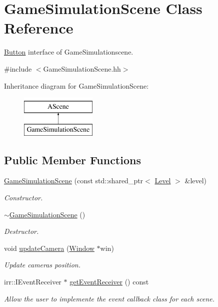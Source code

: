 \hypertarget{classGameSimulationScene}{}\section{Game\+Simulation\+Scene Class Reference}
\label{classGameSimulationScene}


\hyperlink{classButton}{Button} interface of Game\+Simulationscene.  




{\ttfamily \#include $<$Game\+Simulation\+Scene.\+hh$>$}

Inheritance diagram for Game\+Simulation\+Scene\+:\begin{figure}[H]
\begin{center}
\leavevmode
\includegraphics[height=2.000000cm]{classGameSimulationScene}
\end{center}
\end{figure}
\subsection*{Public Member Functions}
\begin{DoxyCompactItemize}
\item 
\hyperlink{classGameSimulationScene_a6983b2c511d45278121bcf62151fbb19}{Game\+Simulation\+Scene} (const std\+::shared\+\_\+ptr$<$ \hyperlink{classLevel}{Level} $>$ \&level)
\begin{DoxyCompactList}\small\item\em Constructor. \end{DoxyCompactList}\item 
\hyperlink{classGameSimulationScene_af45f3e7f70376e59a6f320f21ce2897b}{$\sim$\+Game\+Simulation\+Scene} ()
\begin{DoxyCompactList}\small\item\em Destructor. \end{DoxyCompactList}\item 
void \hyperlink{classGameSimulationScene_a66b107f708b5eed87a3c0a0016541d29}{update\+Camera} (\hyperlink{classWindow}{Window} $\ast$win)
\begin{DoxyCompactList}\small\item\em Update camera\textquotesingle{}s position. \end{DoxyCompactList}\item 
irr\+::\+I\+Event\+Receiver $\ast$ \hyperlink{classGameSimulationScene_a048b2a937caff3af7b4d54f8bd404ec1}{get\+Event\+Receiver} () const
\begin{DoxyCompactList}\small\item\em Allow the user to implemente the event callback class for each scene. \end{DoxyCompactList}\end{DoxyCompactItemize}


